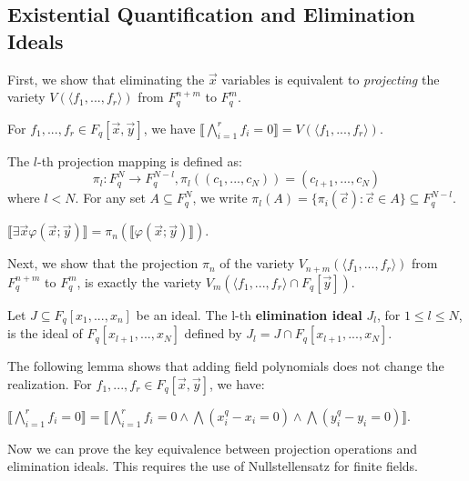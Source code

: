 \documentclass[envcountsect]{llncs}
\begin{document}
\subsection{Existential Quantification and Elimination Ideals}

First, we show that eliminating the $\vec x$ variables is equivalent to {\em projecting} the variety $V(\langle f_1,...,f_r\rangle)$ from $F_q^{n+m}$ to $F_q^{m}$. 

\begin{lemma}\label{formula-ideal}
For $f_1,...,f_r\in F_q[\vec x, \vec y]$, we have $\llbracket \bigwedge_{i=1}^r f_i = 0 \rrbracket = V(\langle f_1,...,f_r\rangle)$.
\end{lemma}

\begin{definition}[Projection]
The $l$-th projection mapping is defined as: $$\pi_l: F_q^{N}\rightarrow F_q^{N-l},\pi_l((c_1,...,c_N))= ( c_{l+1},...,c_{N})$$ where $l<N$.
For any set $A\subseteq F_q^{N}$, we write $\pi_l(A)= \{\pi_i(\vec c): \vec c\in A\}\subseteq F_q^{N-l}.$
\end{definition}

\begin{lemma}\label{just-projection}
$\llbracket \exists \vec x \varphi (\vec x; \vec y)\rrbracket = \pi_n (\llbracket\varphi(\vec x; \vec y)\rrbracket)$.
\end{lemma}

Next, we show that the projection $\pi_n$ of the variety $V_{n+m}(\langle f_1,...,f_r\rangle)$ from $F_q^{n+m}$ to $F_q^m$,  is exactly the variety $V_m(\langle f_1,...,f_r\rangle\cap F_q[\vec y])$. 

\begin{definition}
Let $J\subseteq F_q[x_1,...,x_n]$ be an ideal. The l-th {\bf elimination ideal} $J_l$, for $1\leq l \leq N$, is the ideal of $F_q[x_{l+1},...,x_N]$ defined by $J_l = J\cap F_q[x_{l+1},...,x_N].$
\end{definition}

The following lemma shows that adding field polynomials does not change the realization. For $f_1,...,f_r\in F_q[\vec x, \vec y]$, we have:
\begin{lemma} \label{extend-formulas}
$\llbracket\bigwedge_{i=1}^r f_i = 0\rrbracket= \llbracket \bigwedge_{i=1}^r f_i=0 \wedge \bigwedge (x_i^q-x_i=0)\wedge \bigwedge (y_i^q-y_i=0) \rrbracket.$
\end{lemma}

Now we can prove the key equivalence between projection operations and elimination ideals. This requires the use of Nullstellensatz for finite fields.
\end{document}
